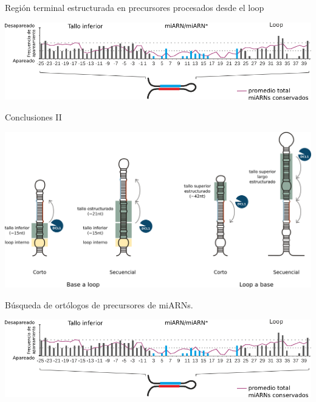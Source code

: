 \documentclass{beamer}
\begin{document}
\begin{frame}{Región terminal estructurada en precursores procesados desde el loop}
	\begin{center}
		\includegraphics[width=.8\textwidth]{img/GR_fig4C.png}
	\end{center}
\end{frame}

\begin{frame}{Conclusiones II}
	\begin{center}
		\includegraphics[width=1\textwidth]{img/mecanismos.png}
	\end{center}
\end{frame}


\begin{frame}{Búsqueda de ortólogos de precursores de miARNs.}
	\begin{center}
		\includegraphics[width=.8\textwidth]{img/GR_fig4C.png}
	\end{center}
\end{frame}
\end{document}
